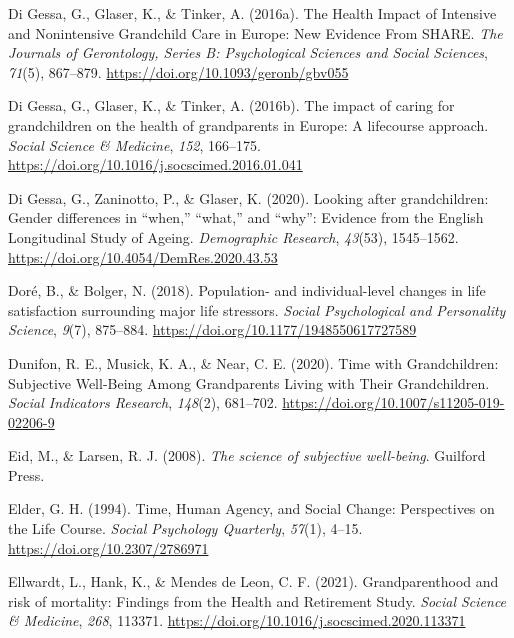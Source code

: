 \documentclass[
  english,
  man,floatsintext]{apa7}
\begin{document}
\leavevmode\hypertarget{ref-digessaHealthImpactIntensive2016}{}%
Di Gessa, G., Glaser, K., \& Tinker, A. (2016a). The Health Impact of Intensive and Nonintensive Grandchild Care in Europe: New Evidence From SHARE. \emph{The Journals of Gerontology, Series B: Psychological Sciences and Social Sciences}, \emph{71}(5), 867--879. \url{https://doi.org/10.1093/geronb/gbv055}

\leavevmode\hypertarget{ref-digessaImpactCaringGrandchildren2016}{}%
Di Gessa, G., Glaser, K., \& Tinker, A. (2016b). The impact of caring for grandchildren on the health of grandparents in Europe: A lifecourse approach. \emph{Social Science \& Medicine}, \emph{152}, 166--175. \url{https://doi.org/10.1016/j.socscimed.2016.01.041}

\leavevmode\hypertarget{ref-digessaLookingGrandchildrenGender2020}{}%
Di Gessa, G., Zaninotto, P., \& Glaser, K. (2020). Looking after grandchildren: Gender differences in ``when,'' ``what,'' and ``why'': Evidence from the English Longitudinal Study of Ageing. \emph{Demographic Research}, \emph{43}(53), 1545--1562. \url{https://doi.org/10.4054/DemRes.2020.43.53}

\leavevmode\hypertarget{ref-dorePopulationIndividuallevelChanges2018}{}%
Doré, B., \& Bolger, N. (2018). Population- and individual-level changes in life satisfaction surrounding major life stressors. \emph{Social Psychological and Personality Science}, \emph{9}(7), 875--884. \url{https://doi.org/10.1177/1948550617727589}

\leavevmode\hypertarget{ref-dunifonTimeGrandchildrenSubjective2020}{}%
Dunifon, R. E., Musick, K. A., \& Near, C. E. (2020). Time with Grandchildren: Subjective Well-Being Among Grandparents Living with Their Grandchildren. \emph{Social Indicators Research}, \emph{148}(2), 681--702. \url{https://doi.org/10.1007/s11205-019-02206-9}

\leavevmode\hypertarget{ref-eidScienceSubjectiveWellbeing2008}{}%
Eid, M., \& Larsen, R. J. (2008). \emph{The science of subjective well-being}. Guilford Press.

\leavevmode\hypertarget{ref-elderTimeHumanAgency1994}{}%
Elder, G. H. (1994). Time, Human Agency, and Social Change: Perspectives on the Life Course. \emph{Social Psychology Quarterly}, \emph{57}(1), 4--15. \url{https://doi.org/10.2307/2786971}

\leavevmode\hypertarget{ref-ellwardtGrandparenthoodRiskMortality2021}{}%
Ellwardt, L., Hank, K., \& Mendes de Leon, C. F. (2021). Grandparenthood and risk of mortality: Findings from the Health and Retirement Study. \emph{Social Science \& Medicine}, \emph{268}, 113371. \url{https://doi.org/10.1016/j.socscimed.2020.113371}
\end{document}
